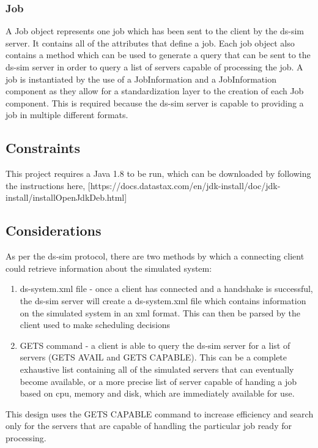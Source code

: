 \documentclass[a4paper]{article}
\begin{document}
\subsubsection*{Job}
A Job object represents one job which has been sent to the client by the ds-sim server. It contains all of the attributes that define a job. Each job object also contains a method which can be used to generate a query that can be sent to the ds-sim server in order to query a list of servers capable of processing the job. A job is instantiated by the use of a JobInformation and a JobInformation component as they allow for a standardization layer to the creation of each Job component. This is required because the ds-sim server is capable to providing a job in multiple different formats.

\subsection{Constraints}
This project requires a Java 1.8 to be run, which can be downloaded by following the instructions here, [https://docs.datastax.com/en/jdk-install/doc/jdk-install/installOpenJdkDeb.html]

\subsection{Considerations}
As per the ds-sim protocol, there are two methods by which a connecting client could retrieve information about the simulated system:
\begin{enumerate}
  \item ds-system.xml file - once a client has connected and a handshake is successful, the ds-sim server will create a ds-system.xml file which contains information on the simulated system in an xml format. This can then be parsed by the client used to make scheduling decisions
  \item GETS command - a client is able to query the ds-sim server for a list of servers (GETS AVAIL and GETS CAPABLE). This can be a complete exhaustive list containing all of the simulated servers that can eventually become available, or a more precise list of server capable of handing a job based on cpu, memory and disk, which are immediately available for use.
\end{enumerate}

This design uses the GETS CAPABLE command to increase efficiency and search only for the servers that are capable of handling the particular job ready for processing. 
\end{document}
